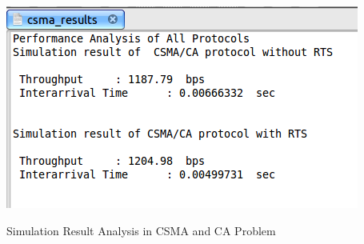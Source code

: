 \documentclass[a4paper,12pt]{report}
\begin{document}
\begin{center}

 \includegraphics[width=15 cm,height=13 cm]{./csma.png}

Simulation Result  Analysis in CSMA and CA Problem
\end{center}
\end{document}
